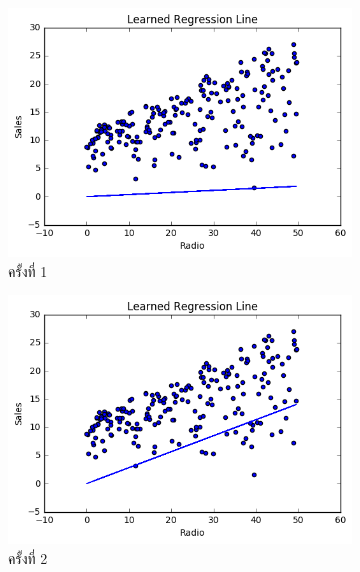 \begin{figure}[htbp]
    \centering
    \begin{subfigure}{0.5\textwidth}
        \centering
        \includegraphics[width=0.9\linewidth]{fig/plot_simple_reg_1.png}
        \caption{ครั้งที่ 1}
        \label{fig:plot_simple_reg_1}
    \end{subfigure}%
    \begin{subfigure}{0.5\textwidth}
        \centering
        \includegraphics[width=0.9\linewidth]{fig/plot_simple_reg_2.png}
        \caption{ครั้งที่ 2}
        \label{fig:plot_simple_reg_2}
    \end{subfigure}
    \\
    \vspace{1em}
    \begin{subfigure}{0.5\textwidth}
        \centering

\end{subfigure}
\end{figure}
